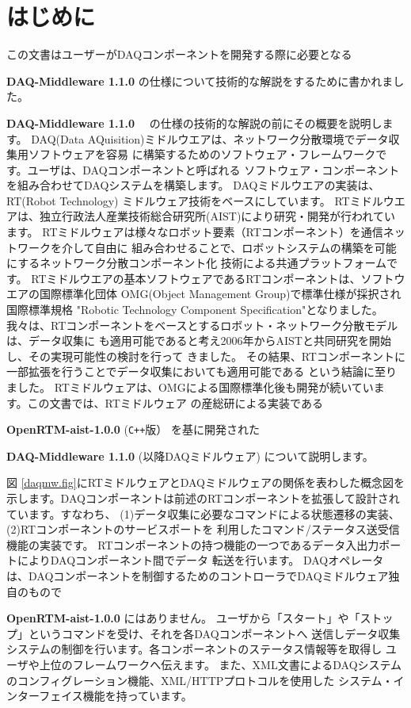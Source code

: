 \documentclass[a4j,10pt,dvips,onecolumn,oneside,final]{jarticle}%
\newcommand {\daqmwcurrent} {
	{\bf DAQ-Middleware 1.1.0}
}
\newcommand {\rtmcurrent} {
	{\bf OpenRTM-aist-1.0.0}
}
\begin{document}
\section{はじめに}\label{intro}
この文書はユーザーがDAQコンポーネントを開発する際に必要となる
\daqmwcurrent の仕様について技術的な解説をするために書かれました。
\daqmwcurrent　の仕様の技術的な解説の前にその概要を説明します。
DAQ(Data AQuisition)ミドルウエアは、ネットワーク分散環境でデータ収集用ソフトウェアを容易
に構築するためのソフトウェア・フレームワークです。ユーザは、DAQコンポーネントと呼ばれる
ソフトウェア・コンポーネントを組み合わせてDAQシステムを構築します。
DAQミドルウエアの実装は、RT(Robot Technology) ミドルウェア\cite{RTM}技術をベースにしています。
RTミドルウエアは、独立行政法人産業技術総合研究所(AIST)により研究・開発が行われています。
RTミドルウェアは様々なロボット要素（RTコンポーネント）を通信ネットワークを介して自由に
組み合わせることで、ロボットシステムの構築を可能にするネットワーク分散コンポーネント化
技術による共通プラットフォームです。
RTミドルウエアの基本ソフトウェアであるRTコンポーネントは、ソフトウエアの国際標準化団体
OMG(Object Management Group)で標準仕様が採択され国際標準規格 
"Robotic Technology Component Specification"\cite{RTM-OMG}となりました。
我々は、RTコンポーネントをベースとするロボット・ネットワーク分散モデルは、データ収集に
も適用可能であると考え2006年からAISTと共同研究を開始し、その実現可能性の検討を行って
きました\cite{CHEP06}。%
その結果、RTコンポーネントに一部拡張を行うことでデータ収集においても適用可能である
という結論に至りました。
RTミドルウェアは、OMGによる国際標準化後も開発が続いています。この文書では、RTミドルウェア
の産総研による実装である
\rtmcurrent (\verb|C++|版）
を基に開発された
\daqmwcurrent(以降DAQミドルウェア)
について説明します。

図 \ref{daqmw.fig}にRTミドルウェアとDAQミドルウェアの関係を表わした概念図を
示します。DAQコンポーネントは前述のRTコンポーネントを拡張して設計されています。すなわち、
(1)データ収集に必要なコマンドによる状態遷移の実装、(2)RTコンポーネントのサービスポートを
利用したコマンド/ステータス送受信機能の実装です。
RTコンポーネントの持つ機能の一つであるデータ入出力ポートによりDAQコンポーネント間でデータ
転送を行います。
DAQオペレータは、DAQコンポーネントを制御するためのコントローラでDAQミドルウェア独自のもので
\rtmcurrent にはありません。
ユーザから「スタート」や「ストップ」というコマンドを受け、それを各DAQコンポーネントへ
送信しデータ収集システムの制御を行います。各コンポーネントのステータス情報等を取得し
ユーザや上位のフレームワークへ伝えます。
また、XML文書によるDAQシステムのコンフィグレーション機能、XML/HTTPプロトコルを使用した
システム・インターフェイス機能を持っています。
\end{document}
